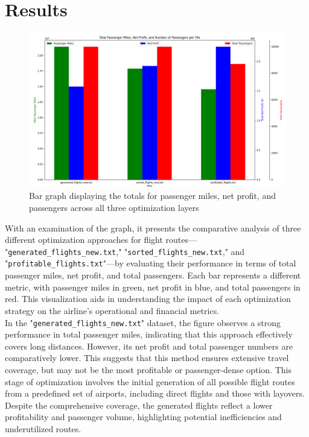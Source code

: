 \documentclass{article}
\begin{document}
\section{Results}

\begin{figure}[H] 
\centering

\begin{minipage}{\textwidth}
    \centering
    \includegraphics[width=\textwidth]{images/Figure_1.png}
    \caption {Bar graph displaying the totals for passenger miles, net profit, and passengers across all three optimization layers}
    \label{fig:bottom}
\end{minipage}

\end{figure}

With an examination of the graph, it presents the comparative analysis of three different optimization approaches for flight routes— "\texttt{generated\_flights\_new.txt}," "\texttt{sorted\_flights\_new.txt}," and "\texttt{profitable\_flights.txt}"—by evaluating their performance in terms of total passenger miles, net profit, and total passengers. Each bar represents a different metric, with passenger miles in green, net profit in blue, and total passengers in red. This visualization aids in understanding the impact of each optimization strategy on the airline's operational and financial metrics.\\

In the "\texttt{generated\_flights\_new.txt}" dataset, the figure observes a strong performance in total passenger miles, indicating that this approach effectively covers long distances. However, its net profit and total passenger numbers are comparatively lower. This suggests that this method ensures extensive travel coverage, but may not be the most profitable or passenger-dense option. This stage of optimization involves the initial generation of all possible flight routes from a predefined set of airports, including direct flights and those with layovers. Despite the comprehensive coverage, the generated flights reflect a lower profitability and passenger volume, highlighting potential inefficiencies and underutilized routes.\\
\end{document}
